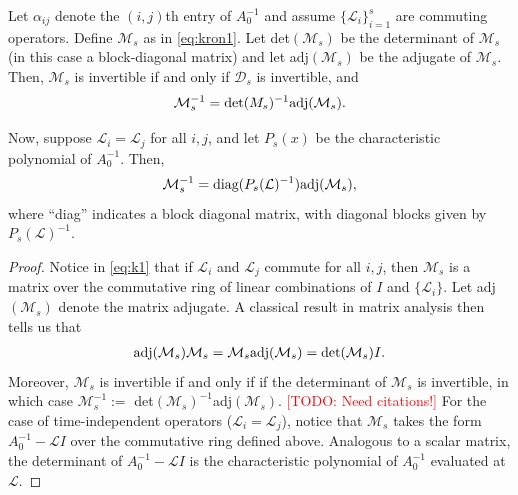 \documentclass[review]{siamart}
\makeatletter
\newcommand{\todo}[1]{\textcolor{red}{[TODO\@: #1]}}
\makeatother
\begin{document}
%
\begin{lemma}\label{lem:inv}
Let $\alpha_{ij}$ denote the $(i,j)$th entry of $A_0^{-1}$ and assume $\{\mathcal{L}_i\}_{i=1}^s$
are commuting operators. Define $\mathcal{M}_s$
as in \eqref{eq:kron1}.
Let det$(\mathcal{M}_s)$ be the determinant of $\mathcal{M}_s$ (in this case a block-diagonal
matrix) and let adj$(\mathcal{M}_s)$ be the adjugate of $\mathcal{M}_s$. Then, $\mathcal{M}_s$
is invertible if and only if $\mathcal{D}_s$ is invertible, and
\begin{align*}
\mathcal{M}_s^{-1} = \textnormal{det}({M}_s)^{-1}\textnormal{adj}(\mathcal{M}_s).
\end{align*}{}

Now, suppose $\mathcal{L}_i = \mathcal{L}_j$ for all $i,j$, and let $P_s(x)$ be the
characteristic polynomial of $A_0^{-1}$. Then,
\begin{align*}
\mathcal{M}_s^{-1} = \textnormal{diag}(P_s(\mathcal{L})^{-1})\textnormal{adj}(\mathcal{M}_s),
\end{align*}
where ``diag'' indicates a block diagonal matrix, with diagonal blocks given by $P_s(\mathcal{L})^{-1}$.
\end{lemma}
%
\begin{proof}
Notice in \eqref{eq:k1} that if $\mathcal{L}_i$ and $\mathcal{L}_j$ commute for all $i,j$,
then $\mathcal{M}_s$ is a matrix over the commutative ring of linear combinations
of $I$ and $\{\mathcal{L}_i\}$. Let adj$(\mathcal{M}_s)$ denote the matrix adjugate. A
classical result in matrix analysis then tells us that
%
\begin{align*} 
\textnormal{adj}(\mathcal{M}_s)\mathcal{M}_s = \mathcal{M}_s\textnormal{adj}(\mathcal{M}_s)
	= \textnormal{det}(\mathcal{M}_s)I.
\end{align*}
%
Moreover, $\mathcal{M}_s$ is invertible if and only if if the determinant of $\mathcal{M}_s$
is invertible, in which case $\mathcal{M}_s^{-1} := $ det$(\mathcal{M}_s)^{-1}$adj$(\mathcal{M}_s)$.
\todo{Need citations!}
For the case of time-independent operators ($\mathcal{L}_i=\mathcal{L}_j$), notice that
$\mathcal{M}_s$ takes the form $A_0^{-1} - \mathcal{L}I$ over the commutative ring defined
above. Analogous to a scalar matrix, the determinant of $A_0^{-1} - \mathcal{L}I$ is the
characteristic polynomial of $A_0^{-1}$ evaluated at $\mathcal{L}$.
\end{proof}
%
\end{document}

